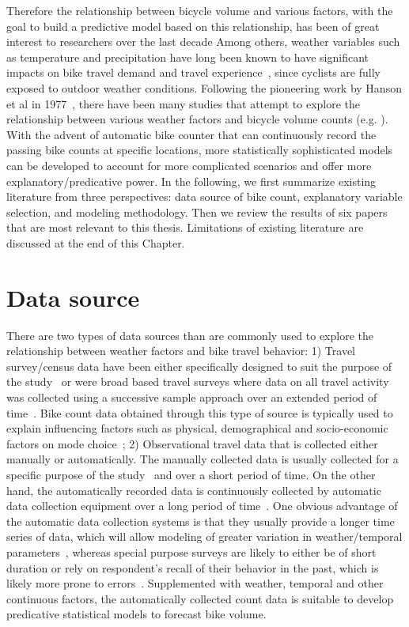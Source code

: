 \documentclass [11pt, proquest] {uwthesis}[2015/03/03]
\begin{document}
Therefore the relationship between bicycle volume and various factors, with the goal to build a predictive model based on this relationship, has been of great interest to researchers over the last decade Among others, weather variables such as temperature and precipitation have long been known to have significant impacts on bike travel demand and travel experience~\cite{Guo07}, since cyclists are fully exposed to outdoor weather conditions. Following the pioneering work by Hanson et al in 1977~\cite{Hanson77}, there have been many studies that attempt to explore the relationship between various weather factors and bicycle volume counts (e.g. \cite{Griswold:2011aa,Fields:2012aa,Niemeier:1996aa,Nosal:2014aa, PeterWeiran16}). With the advent of automatic bike counter that can continuously record the passing bike counts at specific locations, more statistically sophisticated models can be developed to account for more complicated scenarios and offer more explanatory/predicative power. In the following, we first summarize existing literature from three perspectives: data source of bike count, explanatory variable selection, and modeling methodology. Then we review the results of six papers that are most relevant to this thesis. Limitations of existing literature are discussed at the end of this Chapter.



\section{Data source}

There are two types of data sources than are commonly used to explore the relationship between weather factors and bike travel behavior: 1) Travel survey/census data have been either specifically designed to suit the purpose of the study~\cite{Palma97}  or were broad based travel surveys where data on all travel activity was collected using a successive sample approach over an extended period of time~\cite{Richardson:2000aa}. Bike count data obtained through this type of source is typically used to explain influencing factors such as physical, demographical and socio-economic factors on mode choice~\cite{Parkin:2008aa,Helbich:2014aa}; 2) Observational travel data that is collected either manually or automatically. The manually collected data is usually collected for a specific purpose of the study~\cite{Nankervis99} and over a short period of time. On the other hand, the automatically recorded data is continuously collected by automatic data collection equipment over a long period of time~\cite{Griswold:2011aa, Nosal:2014aa, Miranda-Moreno:2011aa, Thomas:2009aa}. One obvious advantage of the automatic data collection systems is that they usually provide a longer time series of data, which will allow modeling of greater variation in weather/temporal parameters~\cite{Ahmed12}, whereas special purpose surveys are likely to either be of short duration or rely on respondent's recall of their behavior in the past, which is likely more prone to errors~\cite{Palma97}. Supplemented with weather, temporal and other continuous factors, the automatically collected count data is suitable to develop predicative statistical models to forecast bike volume.  
\end{document}
